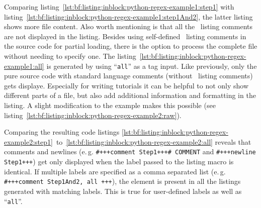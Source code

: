 		\newpage
		Comparing \mbox{listing \ref{lst:bf:listing:inblock:python-regex-example1:step1}} with \mbox{listing \ref{lst:bf:listing:inblock:python-regex-example1:step1And2}}, the latter listing shows more file content. Also worth mentioning is that all the \productName~listing comments are not displayed in the listing. 
		\newline Besides using self-defined \productName~listing comments in the source code for partial loading, there is the option to process the complete file without needing to specify one. The \mbox{listing \ref{lst:bf:listing:inblock:python-regex-example1:all}} is generated by using \enquote{\lstinline[style=LaTeX]$all$} as a tag input. Like previously, only the pure source code with standard language comments (without \productName~listing comments) gets displaye.%
		Especially for writing tutorials it can be helpful to not only show different parts of a file, but also add additional information and formatting in the listing. A slight modification to the example makes this possible (see \mbox{listing \ref{lst:bf:listing:inblock:python-regex-example2:raw}}).
		\lstset{style=Python}
		
	
		\newpage
		Comparing the resulting code listings \mbox{\ref{lst:bf:listing:inblock:python-regex-example2:step1} to \ref{lst:bf:listing:inblock:python-regex-example2:all}} reveals that comments and newlines (\mbox{e.\,g.} \lstinline$#+++comment Step1+++# COMMENT$ and \lstinline$#+++newline Step1+++$) get only displayed when the label passed to the listing macro is identical. If multiple labels are specified as a comma separated list (\mbox{e.\,g.} \lstinline$#+++comment Step1And2, all +++$), the element is present in all the listings generated with matching labels. This is true for user-defined labels as well as \enquote{\lstinline[style=LaTeX]$all$}. 
		
